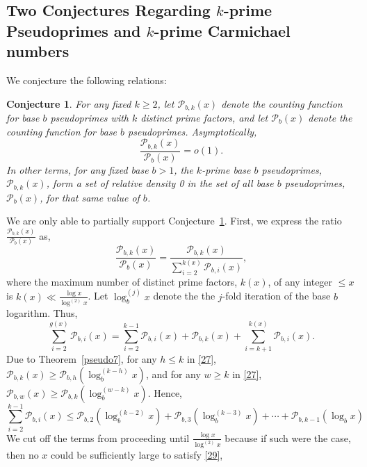 \documentclass[11pt]{article}
\theoremstyle{plain}
\newtheorem{conj}[subsubsection]{Conjecture}
\theoremstyle{definition}
\theoremstyle{remark}
\numberwithin{equation}{subsection}
\begin{document}
\subsection{Two Conjectures Regarding $k$-prime Pseudoprimes and $k$-prime Carmichael numbers}
We conjecture the following relations:
\begin{conj} \label{imp1}
For any fixed $k \ge 2$, let $\mathscr{P}_{b,k}(x)$ denote the counting function for base $b$ pseudoprimes with $k$ distinct prime factors, and let $\mathscr{P}_b(x)$ denote the counting function for base $b$ pseudoprimes.
Asymptotically,
\begin{equation} \label{25}
{\frac{\mathscr{P}_{b,k}(x)}{\mathscr{P}_b(x)}} = o(1).
\end{equation}
In other terms, for any fixed base $b > 1$, the $k$-prime base $b$ pseudoprimes, $\mathscr{P}_{b,k}(x)$, form a set of relative density 0 in the set of \emph{all} base $b$ pseudoprimes, $\mathscr{P}_b(x)$, for that same value of $b$.
\end{conj}
\indent We are only able to partially support Conjecture~\ref{imp1}. First, we express the ratio $\frac{\mathscr{P}_{b,k}(x)}{\mathscr{P}_b(x)}$ as,
\begin{equation} \label{26}
\frac{\mathscr{P}_{b,k}(x)}{\mathscr{P}_b(x)} = \frac{\mathscr{P}_{b,k}(x)}{\displaystyle\sum_{i=2}^{k(x)}\mathscr{P}_{b,i}(x)},
\end{equation}
where the maximum number of distinct prime factors, $k(x)$, of any integer $\le x$ is $k(x) \ll \frac{\log x}{\log^{(2)} x}$. Let $\log^{(j)}_{b} x$ denote the the $j$-fold iteration of the base $b$ logarithm. Thus,
\begin{equation} \label{27}
\displaystyle\sum_{i=2}^{g(x)}\mathscr{P}_{b,i}(x) = \sum_{i=2}^{{k}-1}{\mathscr{P}_{b,i}(x)} + \mathscr{P}_{b,k}(x)+\sum_{i={{k}+1}}^{k(x)}{\mathscr{P}_{b,i}(x)}.
\end{equation}
Due to Theorem~\ref{pseudo7}, for any $h \le k$ in \eqref{27}, $\mathscr{P}_{b,k}(x) \ge \mathscr{P}_{b,h}(\log^{({k}-{h})}_{b} x)$, and for any $w \ge k$ in \eqref{27}, $\mathscr{P}_{b,w}(x) \ge \mathscr{P}_{b,k}(\log^{({w}-{k})}_{b} x)$. Hence,
\begin{equation} \label{28}
\sum_{i=2}^{{k}-1}{\mathscr{P}_{b,i}(x)} \le \mathscr{P}_{b,2} (\log^{(k-2)}_{b} x)+ \mathscr{P}_{b,3}(\log^{(k-3)}_{b} x)+\cdots+\mathscr{P}_{b,{k-1}}(\log_{b} x)
\end{equation}
We cut off the terms from proceeding until $\frac{\log x}{\log^{(2)} x}$ because if such were the case, then no $x$ could be sufficiently large to satisfy \eqref{29},
\end{document}
